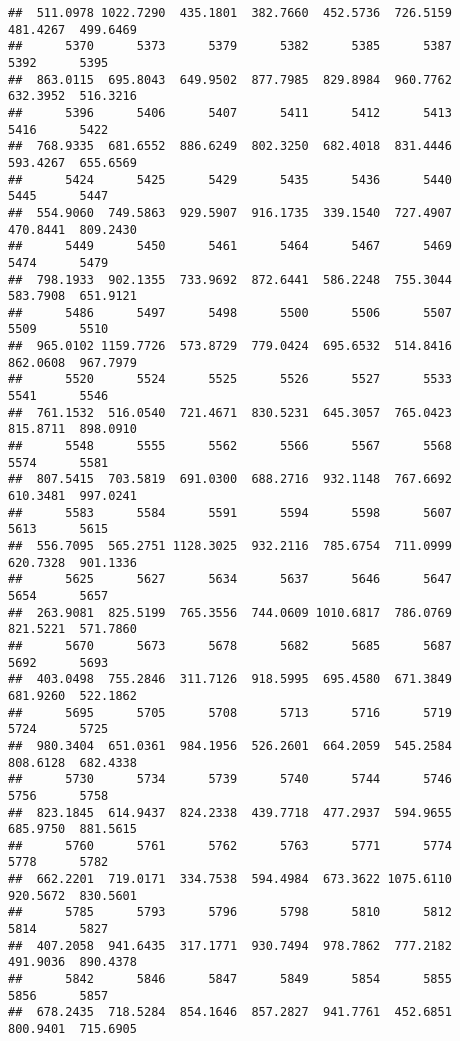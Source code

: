 \documentclass[
]{article}
\begin{document}
\begin{verbatim}
##  511.0978 1022.7290  435.1801  382.7660  452.5736  726.5159  481.4267  499.6469 
##      5370      5373      5379      5382      5385      5387      5392      5395 
##  863.0115  695.8043  649.9502  877.7985  829.8984  960.7762  632.3952  516.3216 
##      5396      5406      5407      5411      5412      5413      5416      5422 
##  768.9335  681.6552  886.6249  802.3250  682.4018  831.4446  593.4267  655.6569 
##      5424      5425      5429      5435      5436      5440      5445      5447 
##  554.9060  749.5863  929.5907  916.1735  339.1540  727.4907  470.8441  809.2430 
##      5449      5450      5461      5464      5467      5469      5474      5479 
##  798.1933  902.1355  733.9692  872.6441  586.2248  755.3044  583.7908  651.9121 
##      5486      5497      5498      5500      5506      5507      5509      5510 
##  965.0102 1159.7726  573.8729  779.0424  695.6532  514.8416  862.0608  967.7979 
##      5520      5524      5525      5526      5527      5533      5541      5546 
##  761.1532  516.0540  721.4671  830.5231  645.3057  765.0423  815.8711  898.0910 
##      5548      5555      5562      5566      5567      5568      5574      5581 
##  807.5415  703.5819  691.0300  688.2716  932.1148  767.6692  610.3481  997.0241 
##      5583      5584      5591      5594      5598      5607      5613      5615 
##  556.7095  565.2751 1128.3025  932.2116  785.6754  711.0999  620.7328  901.1336 
##      5625      5627      5634      5637      5646      5647      5654      5657 
##  263.9081  825.5199  765.3556  744.0609 1010.6817  786.0769  821.5221  571.7860 
##      5670      5673      5678      5682      5685      5687      5692      5693 
##  403.0498  755.2846  311.7126  918.5995  695.4580  671.3849  681.9260  522.1862 
##      5695      5705      5708      5713      5716      5719      5724      5725 
##  980.3404  651.0361  984.1956  526.2601  664.2059  545.2584  808.6128  682.4338 
##      5730      5734      5739      5740      5744      5746      5756      5758 
##  823.1845  614.9437  824.2338  439.7718  477.2937  594.9655  685.9750  881.5615 
##      5760      5761      5762      5763      5771      5774      5778      5782 
##  662.2201  719.0171  334.7538  594.4984  673.3622 1075.6110  920.5672  830.5601 
##      5785      5793      5796      5798      5810      5812      5814      5827 
##  407.2058  941.6435  317.1771  930.7494  978.7862  777.2182  491.9036  890.4378 
##      5842      5846      5847      5849      5854      5855      5856      5857 
##  678.2435  718.5284  854.1646  857.2827  941.7761  452.6851  800.9401  715.6905 

\end{verbatim}
\end{document}
